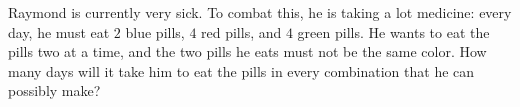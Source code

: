 Raymond is currently very sick. To combat this, he is taking a lot medicine: every day, he must eat $2$ blue pills, $4$ red pills, and $4$ green pills. He wants to eat the pills two at a time, and the two pills he eats must not be the same color. How many days will it take him to eat the pills in every combination that he can possibly make?

